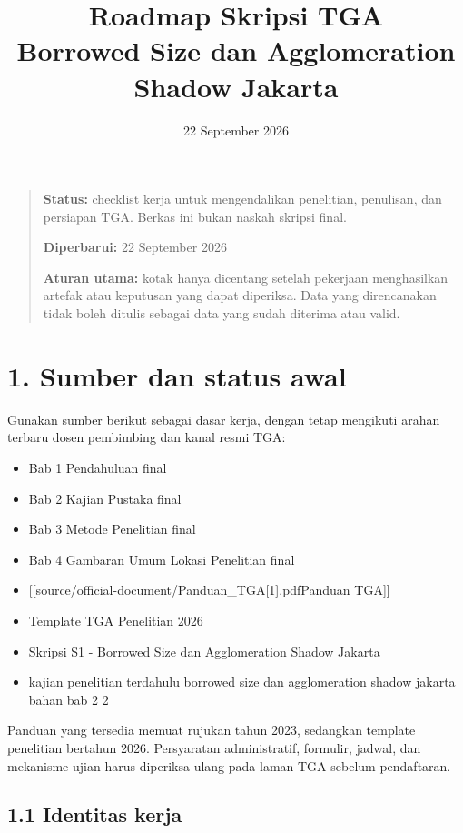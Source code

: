 \documentclass[
  indonesian,
  11pt,
]{article}
\title{Roadmap Skripsi TGA\\[0.35em]
  \large Borrowed Size dan Agglomeration Shadow Jakarta}
\author{}
\date{22 September 2026}
\providecommand{\tightlist}{%
  \setlength{\itemsep}{0pt}\setlength{\parskip}{0pt}}
\renewcommand{\tightlist}{%
  \setlength{\itemsep}{0.22em}%
  \setlength{\parskip}{0pt}%
}
\begin{document}
\maketitle
\renewcommand*\contentsname{Daftar Isi}
\setcounter{tocdepth}{2}
\tableofcontents\clearpage
\begin{quote}
\textbf{Status:} checklist kerja untuk mengendalikan penelitian,
penulisan, dan persiapan TGA. Berkas ini bukan naskah skripsi final.

\textbf{Diperbarui:} 22 September 2026

\textbf{Aturan utama:} kotak hanya dicentang setelah pekerjaan
menghasilkan artefak atau keputusan yang dapat diperiksa. Data yang
direncanakan tidak boleh ditulis sebagai data yang sudah diterima atau
valid.
\end{quote}

\section{1. Sumber dan status awal}\label{sumber-dan-status-awal}

Gunakan sumber berikut sebagai dasar kerja, dengan tetap mengikuti
arahan terbaru dosen pembimbing dan kanal resmi TGA:

\begin{itemize}
\tightlist
\item
  Bab 1 Pendahuluan final
\item
  Bab 2 Kajian Pustaka final
\item
  Bab 3 Metode Penelitian final
\item
  Bab 4 Gambaran Umum Lokasi Penelitian final
\item
  {[}{[}source/official-document/Panduan\_TGA{[}1{]}.pdf\textbar Panduan
  TGA{]}{]}
\item
  Template TGA Penelitian 2026
\item
  Skripsi S1 - Borrowed Size dan Agglomeration Shadow Jakarta
\item
  kajian penelitian terdahulu borrowed size dan agglomeration shadow
  jakarta bahan bab 2 2
\end{itemize}

Panduan yang tersedia memuat rujukan tahun 2023, sedangkan template
penelitian bertahun 2026. Persyaratan administratif, formulir, jadwal,
dan mekanisme ujian harus diperiksa ulang pada laman TGA sebelum
pendaftaran.

\subsection{1.1 Identitas kerja}\label{identitas-kerja}
\end{document}
